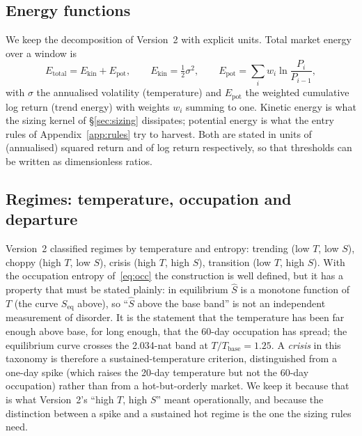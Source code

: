 \documentclass[11pt]{article}
\newcommand{\Tb}{T_{\mathrm{base}}}
\begin{document}
\subsection{Energy functions}\label{sec:energy}
We keep the decomposition of Version~2 with explicit units. Total market energy over a window is
\begin{equation}
E_{\mathrm{total}}=E_{\mathrm{kin}}+E_{\mathrm{pot}},\qquad E_{\mathrm{kin}}=\tfrac12\sigma^2,\qquad E_{\mathrm{pot}}=\sum_{i}w_i\ln\frac{P_i}{P_{i-1}}, \label{eq:energy}
\end{equation}
with $\sigma$ the annualised volatility (temperature) and $E_{\mathrm{pot}}$ the weighted cumulative log return (trend energy) with weights $w_i$ summing to one. Kinetic energy is what the sizing kernel of \S\ref{sec:sizing} dissipates; potential energy is what the entry rules of Appendix~\ref{app:rules} try to harvest. Both are stated in units of (annualised) squared return and of log return respectively, so that thresholds can be written as dimensionless ratios.

\subsection{Regimes: temperature, occupation and departure}\label{sec:regimes}
Version~2 classified regimes by temperature and entropy: trending (low $T$, low $S$), choppy (high $T$, low $S$), crisis (high $T$, high $S$), transition (low $T$, high $S$). With the occupation entropy of~\eqref{eq:occ} the construction is well defined, but it has a property that must be stated plainly: in equilibrium $\hat S$ is a monotone function of $T$ (the curve $S_{\mathrm{eq}}$ above), so ``$\hat S$ above the base band'' is not an independent measurement of disorder. It is the statement that the temperature has been far enough above base, for long enough, that the 60-day occupation has spread; the equilibrium curve crosses the 2.034-nat band at $T/\Tb=1.25$. A \emph{crisis} in this taxonomy is therefore a sustained-temperature criterion, distinguished from a one-day spike (which raises the 20-day temperature but not the 60-day occupation) rather than from a hot-but-orderly market. We keep it because that is what Version~2's ``high $T$, high $S$'' meant operationally, and because the distinction between a spike and a sustained hot regime is the one the sizing rules need.
\end{document}
